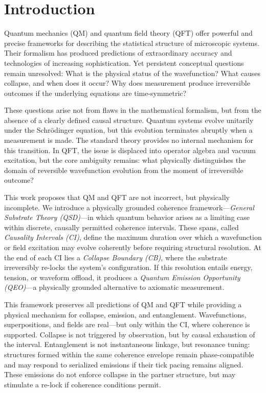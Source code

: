 \documentclass[entropy,article,submit,pdftex,moreauthors]{Definitions/mdpi}
\begin{document}

\section{Introduction}

Quantum mechanics (QM) and quantum field theory (QFT) offer powerful and precise frameworks for describing the statistical structure of microscopic systems. Their formalism has produced predictions of extraordinary accuracy and technologies of increasing sophistication. Yet persistent conceptual questions remain unresolved: What is the physical status of the wavefunction? What causes collapse, and when does it occur? Why does measurement produce irreversible outcomes if the underlying equations are time-symmetric?

These questions arise not from flaws in the mathematical formalism, but from the absence of a clearly defined causal structure. Quantum systems evolve unitarily under the Schrödinger equation, but this evolution terminates abruptly when a measurement is made. The standard theory provides no internal mechanism for this transition. In QFT, the issue is displaced into operator algebra and vacuum excitation, but the core ambiguity remains: what physically distinguishes the domain of reversible wavefunction evolution from the moment of irreversible outcome?

This work proposes that QM and QFT are not incorrect, but physically incomplete. We introduce a physically grounded coherence framework—\textit{General Substrate Theory (QSD)}—in which quantum behavior arises as a limiting case within discrete, causally permitted coherence intervals. These spans, called \textit{Causality Intervals (CI)}, define the maximum duration over which a wavefunction or field excitation may evolve coherently before requiring structural resolution. At the end of each CI lies a \textit{Collapse Boundary (CB)}, where the substrate irreversibly re-locks the system's configuration. If this resolution entails energy, tension, or waveform offload, it produces a \textit{Quantum Emission Opportunity (QEO)}—a physically grounded alternative to axiomatic measurement.

This framework preserves all predictions of QM and QFT while providing a physical mechanism for collapse, emission, and entanglement. Wavefunctions, superpositions, and fields are real—but only within the CI, where coherence is supported. Collapse is not triggered by observation, but by causal exhaustion of the interval. Entanglement is not instantaneous linkage, but resonance tuning: structures formed within the same coherence envelope remain phase-compatible and may respond to serialized emissions if their tick pacing remains aligned. These emissions do not enforce collapse in the partner structure, but may stimulate a re-lock if coherence conditions permit.
\end{document}
